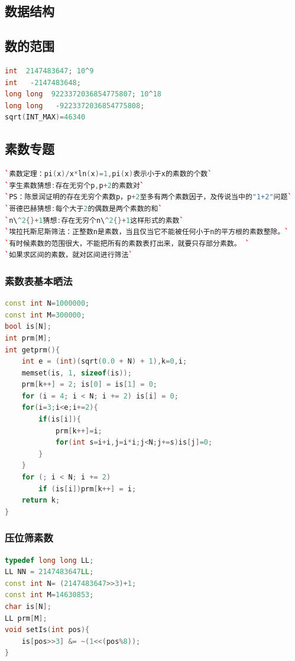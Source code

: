 \documentclass[a4paper]{article}
\begin{document}
\begin{CJK*}{UTF8}{gbsn}
\begin{multicols}{3}
\begin{flushleft}
\section{数据结构}

\subsection{数的范围}
\begin{lstlisting}[language={c++}]
int  2147483647; 10^9
int   -2147483648;
long long  9223372036854775807; 10^18
long long   -9223372036854775808;
sqrt(INT_MAX)=46340
\end{lstlisting}

\subsection{素数专题}
\begin{lstlisting}[language={c++}]
`素数定理：pi(x)/x*ln(x)=1,pi(x)表示小于x的素数的个数`
`孪生素数猜想:存在无穷个p,p+2的素数对`
`PS：陈景润证明的存在无穷个素数p，p+2至多有两个素数因子，及传说当中的"1+2"问题`
`哥德巴赫猜想:每个大于2的偶数是两个素数的和`
`n\^2{}+1猜想:存在无穷个n\^2{}+1这样形式的素数`
`埃拉托斯尼斯筛法：正整数n是素数，当且仅当它不能被任何小于n的平方根的素数整除。`
`有时候素数的范围很大，不能把所有的素数表打出来，就要只存部分素数。 `
`如果求区间的素数，就对区间进行筛法`
\end{lstlisting}


\subsubsection{素数表基本晒法}
\begin{lstlisting}[language={c++}]
const int N=1000000;
const int M=300000;
bool is[N]; 
int prm[M];
int getprm(){
	int e = (int)(sqrt(0.0 + N) + 1),k=0,i;
	memset(is, 1, sizeof(is));
	prm[k++] = 2; is[0] = is[1] = 0;
	for (i = 4; i < N; i += 2) is[i] = 0;
	for(i=3;i<e;i+=2){
		if(is[i]){
			prm[k++]=i;
			for(int s=i+i,j=i*i;j<N;j+=s)is[j]=0;
		}
	}
	for (; i < N; i += 2)
		if (is[i])prm[k++] = i;
	return k; 
}
\end{lstlisting}


\subsubsection{压位筛素数}
\begin{lstlisting}[language={c++}]
typedef long long LL;
LL NN = 2147483647LL;
const int N= (2147483647>>3)+1;
const int M=14630853;
char is[N];
LL prm[M];
void setIs(int pos){
    is[pos>>3] &= ~(1<<(pos%8));
}


\end{lstlisting}
\end{flushleft}
\end{multicols}
\end{CJK*}
\end{document}
